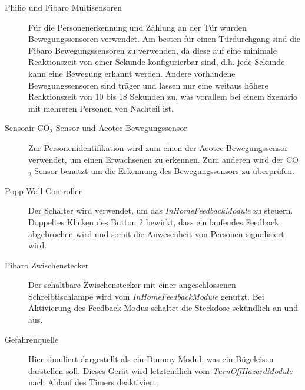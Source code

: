 \begin{description}
\item [Philio und Fibaro Multisensoren] Für die Personenerkennung und Zählung an der Tür wurden Bewegungssensoren verwendet. Am besten für einen Türdurchgang sind die Fibaro Bewegungssensoren zu verwenden, da diese auf eine minimale Reaktionszeit von einer Sekunde konfigurierbar sind, d.h. jede Sekunde kann eine Bewegung erkannt werden. Andere vorhandene Bewegungssensoren sind träger und lassen nur eine weitaus höhere Reaktionszeit von 10 bis 18 Sekunden zu, was vorallem bei einem Szenario mit mehreren Personen von Nachteil ist.

\item [Sensoair CO$_2$ Sensor und Aeotec Bewegungssensor] Zur Personenidentifikation wird zum einen der Aeotec Bewegungssensor verwendet, um einen Erwachsenen zu erkennen. Zum anderen wird der CO$_2$ Sensor benutzt um die Erkennung des Bewegungssensors zu überprüfen.

\item [Popp Wall Controller] Der Schalter wird verwendet, um das \emph{InHomeFeedbackModule} zu steuern. Doppeltes Klicken des Button 2 bewirkt, dass ein laufendes Feedback abgebrochen wird und somit die Anwesenheit von Personen signalisiert wird.

\item [Fibaro Zwischenstecker] Der schaltbare Zwischenstecker mit einer angeschlossenen Schreibtischlampe wird vom \emph{InHomeFeedbackModule} genutzt. Bei Aktivierung des Feedback-Modus schaltet die Steckdose sekündlich an und aus.

\item [Gefahrenquelle] Hier simuliert dargestellt als ein Dummy Modul, was ein Bügeleisen darstellen soll. Dieses Gerät wird letztendlich vom \emph{TurnOffHazardModule} nach Ablauf des Timers deaktiviert.
\end{description}

\newpage

